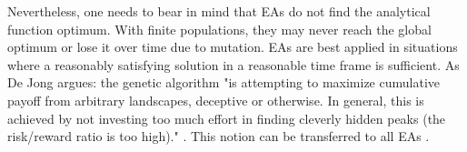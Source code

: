 Nevertheless, one needs to bear in mind that EAs do not find the analytical function optimum. With finite populations, they may never reach the global optimum or lose it over time due to mutation. EAs are best applied in situations where a reasonably satisfying solution in a reasonable time frame is sufficient. As De Jong argues: the genetic algorithm "is attempting to maximize cumulative payoff from arbitrary landscapes, deceptive or otherwise. In general, this is achieved by not investing too much effort in finding cleverly hidden peaks (the risk/reward ratio is too high)." \cite[p. 15]{de1993genetic}. This notion can be transferred to all EAs \cite[p. 92]{mitchell1999introduction}.\\ %







